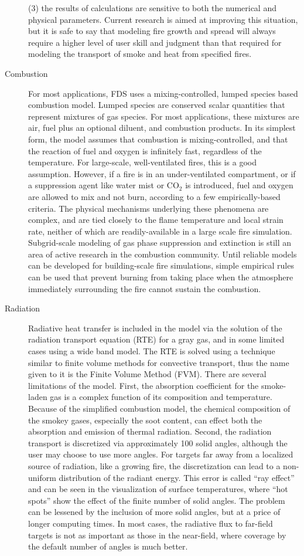 \documentclass[11pt]{book}
\begin{document}
\begin{description}
(3) the results of calculations are sensitive to both the numerical and physical parameters. Current research is aimed at improving this situation,
but it is safe to say that modeling fire growth and spread will always require a higher level of user skill and judgment than that required for
modeling the transport of smoke and heat from specified fires.
\item[Combustion]
For most applications, FDS uses a mixing-controlled, lumped species based combustion model. Lumped species are conserved scalar quantities that
represent mixtures of gas species.  For most applications, these mixtures are air, fuel plus an optional diluent, and combustion products.  In its
simplest form, the model assumes that combustion is mixing-controlled, and that the reaction of fuel and oxygen is infinitely fast, regardless of the
temperature. For large-scale, well-ventilated fires, this is a good assumption. However, if a fire is in an under-ventilated compartment, or if a
suppression agent like water mist or CO$_2$ is introduced, fuel and oxygen are allowed to mix and not burn, according to a few empirically-based
criteria. The physical mechanisms underlying these phenomena are complex, and are tied closely to the flame temperature and local strain rate,
neither of which are readily-available in a large scale fire simulation. Subgrid-scale modeling of gas phase suppression and extinction is still an
area of active research in the combustion community. Until reliable models can be developed for building-scale fire simulations, simple empirical
rules can be used that prevent burning from taking place when the atmosphere immediately surrounding the fire cannot sustain the combustion.
\item[Radiation] Radiative heat transfer is included in the model via
the solution of the radiation transport equation (RTE) for a gray gas, and in some limited cases using a wide band model.  The RTE is solved using a
technique similar to finite volume methods for convective transport, thus the name given to it is the Finite Volume Method (FVM). There are several
limitations of the model. First, the absorption coefficient for the smoke-laden gas is a complex function of its composition and temperature. Because
of the simplified combustion model, the chemical composition of the smokey gases, especially the soot content, can effect both the absorption and
emission of thermal radiation.  Second, the radiation transport is discretized via approximately 100 solid angles, although the user may choose to
use more angles. For targets far away from a localized source of radiation, like a growing fire, the discretization can lead to a non-uniform
distribution of the radiant energy. This error is called ``ray effect'' and can be seen in the visualization of surface temperatures, where ``hot
spots'' show the effect of the finite number of solid angles. The problem can be lessened by the inclusion of more solid angles, but at a price of
longer computing times. In most cases, the radiative flux to far-field targets is not as important as those in the near-field, where coverage by the
default number of angles is much better.
\end{description}
\end{document}

